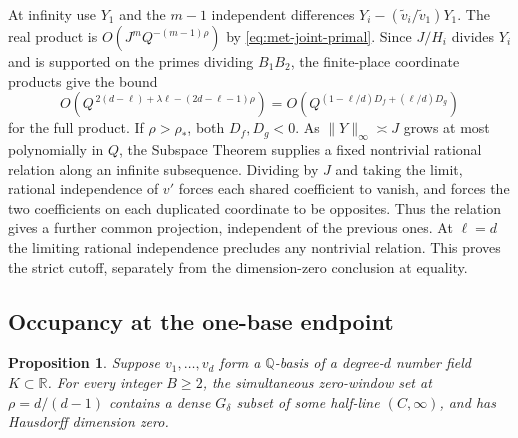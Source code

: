 \documentclass[11pt,reqno,a4paper]{amsart}
\newtheorem{proposition}[theorem]{Proposition}
\theoremstyle{remark}
\begin{document}
At infinity use \(Y_1\) and the \(m-1\) independent differences
\(Y_i-(\widetilde v_i/\widetilde v_1)Y_1\). The real product is
\(O(J^mQ^{-(m-1)\rho})\) by \eqref{eq:met-joint-primal}. Since
\(J/H_i\) divides \(Y_i\) and is supported on the primes dividing
\(B_1B_2\), the finite-place coordinate products give the bound
\[
 O\!\left(Q^{\,2(d-\ell)+\lambda\ell-(2d-\ell-1)\rho}\right)
 = O\!\left(Q^{(1-\ell/d)D_f+(\ell/d)D_g}\right)
\]
for the full product. If \(\rho>\rho_*\), both \(D_f,D_g<0\).
As \(\|Y\|_\infty\asymp J\) grows at most polynomially in \(Q\),
the Subspace Theorem supplies a fixed nontrivial rational relation
along an infinite subsequence. Dividing by \(J\) and taking the
limit, rational independence of \(v'\) forces each shared
coefficient to vanish, and forces the two coefficients on each
duplicated coordinate to be opposites. Thus the relation gives
a further common projection, independent of the previous ones.
At \(\ell=d\) the limiting rational independence precludes any
nontrivial relation. This proves the strict cutoff, separately
from the dimension-zero conclusion at equality.

\subsection{Occupancy at the one-base endpoint}

\begin{proposition}\label{prop:met-critical-field}
Suppose \(v_1,\ldots,v_d\) form a \(\mathbb Q\)-basis of a
degree-\(d\) number field \(K\subset\mathbb R\). For every integer
\(B\geq2\), the simultaneous zero-window set at
\(\rho=d/(d-1)\) contains a dense \(G_\delta\) subset of some
half-line \((C,\infty)\), and has Hausdorff dimension zero.
\end{proposition}
\end{document}
